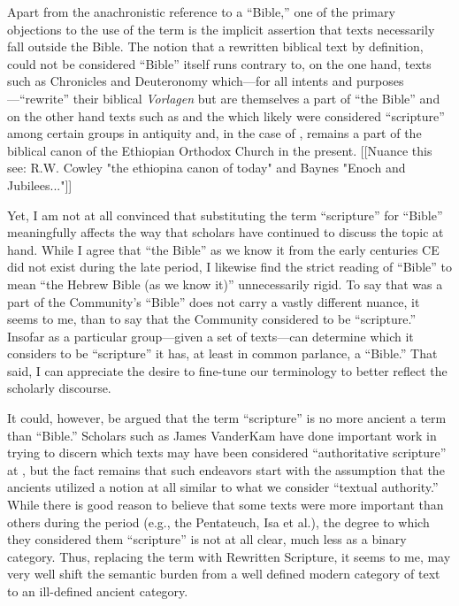  Apart from the anachronistic reference to a ``Bible,'' one of the primary objections to the use of the term \rwb is the implicit assertion that \rwb texts necessarily fall outside the Bible.\autocite[61]{campbell_zsengeller2014} The notion that a rewritten biblical text by definition, could not be considered ``Bible'' itself runs contrary to, on the one hand, texts such as Chronicles and Deuteronomy which---for all intents and purposes---``rewrite'' their biblical \emph{Vorlagen} but are themselves a part of ``the Bible'' and on the other hand texts such as \jub and the \templescroll which likely were considered ``scripture'' among certain groups in antiquity and, in the case of \jub, remains a part of the biblical canon of the Ethiopian Orthodox Church in the present. [[Nuance this see: R.W. Cowley  "the ethiopina canon of today" and Baynes "Enoch and Jubilees..."]] 

 Yet, I am not at all convinced that substituting the term ``scripture'' for ``Bible'' meaningfully affects the way that scholars have continued to discuss the topic at hand. While I agree that ``the Bible'' as we know it from the early centuries CE did not exist during the late \secondtemple period, I likewise find the strict reading of ``Bible'' to mean ``the Hebrew Bible (as we know it)'' unnecessarily rigid. To say that \jub was a part of the \qumran Community's ``Bible'' does not carry a vastly different nuance, it seems to me, than to say that the \qumran Community considered \jub to be ``scripture.'' Insofar as a particular group---given a set of texts---can determine which it considers to be ``scripture'' it has, at least in common parlance, a ``Bible.'' That said, I can appreciate the desire to fine-tune our terminology to better reflect the scholarly discourse. 

 It could, however, be argued that the term ``scripture'' is no more ancient a term than ``Bible.'' Scholars such as James VanderKam have done important work in trying to discern which texts may have been considered ``authoritative scripture'' at \qumran,\autocite{vanderkam_dsd1998} but the fact remains that such endeavors start with the assumption that the ancients utilized a notion at all similar to what we consider ``textual authority.'' While there is good reason to believe that some texts were more important than others during the \secondtemple period (e.g., the Pentateuch, Isa et al.), the degree to which they considered them ``scripture'' is not at all clear, much less as a binary category. Thus, replacing the term \rwb with Rewritten Scripture, it seems to me, may very well shift the semantic burden from a well defined modern category of text to an ill-defined ancient category. 

